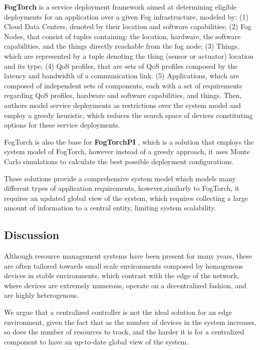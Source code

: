 \textbf{FogTorch} \cite{Brogi2017} is a service deployment framework aimed at determining eligible deployments for an application over a given Fog infrastructure, modeled by: (1) Cloud Data Centers, denoted by their location and software capabilities; (2) Fog Nodes, that consist of tuples containing: the location, hardware, the software capabilities, and the things directly reachable from the fog node; (3) Things, which are represented by a tuple denoting the thing (sensor or actuator) location and its type; (4) QoS profiles, that are sets of QoS profiles composed by the latency and bandwidth of a communication link. (5) Applications, which are composed of independent sets of components, each with a set of requirements regarding QoS profiles, hardware and software capabilities, and things. Then, authors model service deployments as restrictions over the system model and employ a greedy heuristic, which reduces the search space of devices constituting options for these service deployments.

FogTorch is also the base for \textbf{FogTorchPI} \cite{brogi2017best}, which is a solution that employs the system model of FogTorch, however instead of a greedy approach, it uses Monte Carlo simulations to calculate the best possible deployment configurations.

These solutions provide a comprehensive system model which models many different types of application requirements, however,similarly to FogTorch, it requires an updated global view of the system, which requires collecting a large amount of information to a central entity, limiting system scalability.

\subsection{Discussion}

Although resource management systems have been present for many years, these are often tailored towards small scale environments composed by homogenous devices in stable environments, which contrast with the edge of the network, where devices are extremely numerous, operate on a decentralized fashion, and are highly heterogenous.

We argue that a centralized controller is not the ideal solution for an edge environment, given the fact that as the number of devices in the system increases, so does the number of resources to track, and the harder it is for a centralized component to have an up-to-date global view of the system.


